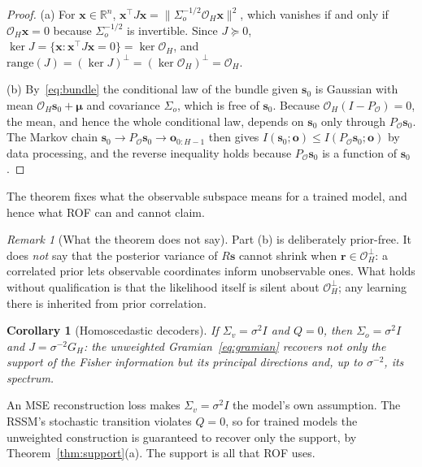\documentclass[11pt]{article}
\newcommand{\norm}[1]{\lVert #1 \rVert}
\newcommand{\R}{\mathbb{R}}
\newcommand{\Obs}{\mathcal{O}}
\newtheorem{corollary}{Corollary}
\theoremstyle{remark}
\newtheorem{remark}{Remark}
\begin{document}
\begin{proof}
(a) For $\bm{x} \in \R^n$, $\bm{x}^\top J \bm{x} = \norm{\Sigma_o^{-1/2} \mathcal{O}_H \bm{x}}^2$, which vanishes if and only if $\mathcal{O}_H \bm{x} = 0$ because $\Sigma_o^{-1/2}$ is invertible. Since $J \succeq 0$, $\ker J = \{\bm{x} : \bm{x}^\top J \bm{x} = 0\} = \ker \mathcal{O}_H$, and $\mathrm{range}(J) = (\ker J)^\perp = (\ker \mathcal{O}_H)^\perp = \Obs_H$.

(b) By~\eqref{eq:bundle} the conditional law of the bundle given $\bm{s}_0$ is Gaussian with mean $\mathcal{O}_H \bm{s}_0 + \bm{\mu}$ and covariance $\Sigma_o$, which is free of $\bm{s}_0$. Because $\mathcal{O}_H (I - P_\Obs) = 0$, the mean, and hence the whole conditional law, depends on $\bm{s}_0$ only through $P_\Obs \bm{s}_0$. The Markov chain $\bm{s}_0 \to P_\Obs \bm{s}_0 \to \bm{o}_{0:H-1}$ then gives $I(\bm{s}_0; \bm{o}) \le I(P_\Obs \bm{s}_0; \bm{o})$ by data processing, and the reverse inequality holds because $P_\Obs \bm{s}_0$ is a function of $\bm{s}_0$.
\end{proof}

The theorem fixes what the observable subspace means for a trained model, and hence what ROF can and cannot claim.

\begin{remark}[What the theorem does not say]
Part (b) is deliberately prior-free. It does \emph{not} say that the posterior variance of $R\bm{s}$ cannot shrink when $\bm{r} \in \Obs_H^\perp$: a correlated prior lets observable coordinates inform unobservable ones. What holds without qualification is that the likelihood itself is silent about $\Obs_H^\perp$; any learning there is inherited from prior correlation.
\end{remark}

\begin{corollary}[Homoscedastic decoders]\label{cor:mse}
If $\Sigma_v = \sigma^2 I$ and $Q = 0$, then $\Sigma_o = \sigma^2 I$ and $J = \sigma^{-2} G_H$: the unweighted Gramian~\eqref{eq:gramian} recovers not only the support of the Fisher information but its principal directions and, up to $\sigma^{-2}$, its spectrum.
\end{corollary}

An MSE reconstruction loss makes $\Sigma_v = \sigma^2 I$ the model's own assumption. The RSSM's stochastic transition violates $Q = 0$, so for trained models the unweighted construction is guaranteed to recover only the support, by Theorem~\ref{thm:support}(a). The support is all that ROF uses.
\end{document}
